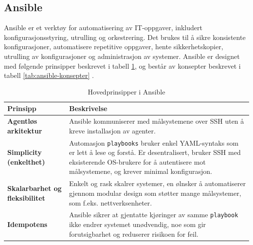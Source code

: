 \subsection{Ansible}
Ansible er et verktøy for automatisering av IT-oppgaver, inkludert konfigurasjonsstyring, utrulling og orkestrering. Det brukes til å sikre konsistente konfigurasjoner, automatisere repetitive oppgaver, hente sikkerhetskopier, utrulling av konfigurasjoner og administrasjon av systemer. Ansible er designet med følgende prinsipper beskrevet i tabell \ref{tab:ansible-prinsipper}, og består av konsepter beskrevet i tabell \ref{tab:ansible-konsepter} \cite{ansible}.
\begin{table}[H]

\centering

\caption{Hovedprinsipper i Ansible}

\label{tab:ansible-prinsipper}

\small

\renewcommand{\arraystretch}{1.25}

\begin{tabular}{@{}ll@{}}

\toprule

\parbox[t]{0.3\textwidth}{\textbf{Prinsipp}} & \parbox[t]{0.7\textwidth}{\textbf{Beskrivelse}} \\

\midrule

\parbox[t]{0.3\textwidth}{\footnotesize\textbf{Agentløs arkitektur}} & \parbox[t]{0.7\textwidth}{\raggedright Ansible kommuniserer med målsystemene over SSH uten å kreve installasjon av agenter.} \\

\addlinespace

\parbox[t]{0.3\textwidth}{\footnotesize\textbf{Simplicity (enkelthet)}} & \parbox[t]{0.7\textwidth}{\raggedright Automasjon \texttt{playbooks} bruker enkel YAML-syntaks som er lett å lese og forstå. Er desentralisert, bruker SSH med eksisterende OS-brukere for å autentisere mot målsystemene, og krever minimal konfigurasjon.} \\

\addlinespace

\parbox[t]{0.3\textwidth}{\footnotesize\textbf{Skalarbarhet og fleksibilitet}} & \parbox[t]{0.7\textwidth}{\raggedright Enkelt og rask skalrer systemer, en ølnsker å automatiserer gjennom modular design som støtter mange målsystemer, som f.eks. nettverksenheter.} \\

\addlinespace

\parbox[t]{0.3\textwidth}{\footnotesize\textbf{Idempotens}} & \parbox[t]{0.7\textwidth}{\raggedright Ansible sikrer at gjentatte kjøringer av samme \texttt{playbook} ikke endrer systemet unødvendig, noe som gir forutsigbarhet og reduserer risikoen for feil.} \\

\bottomrule

\end{tabular}

\end{table}

